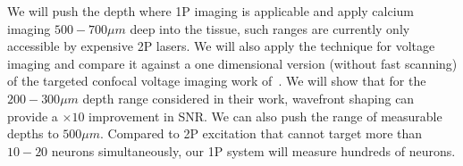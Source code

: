 	
	 We will push the depth where 1P imaging is applicable and apply calcium imaging  $500-700\mu m$ deep into the tissue, such ranges  are currently only accessible by expensive 2P lasers. 
	We will also apply the technique for voltage imaging and compare it against a one dimensional version (without fast scanning) of the targeted confocal voltage imaging work of~\cite{Xiao2024LargeScale}. We will show that for the $200-300\mu m$ depth range considered in their work, wavefront shaping can provide a $\times 10$ improvement in SNR.  We can also push the range of measurable depths to $500\mu m$. Compared to 2P excitation that cannot target more than $10-20$ neurons simultaneously, our 1P system will measure hundreds of neurons. 
